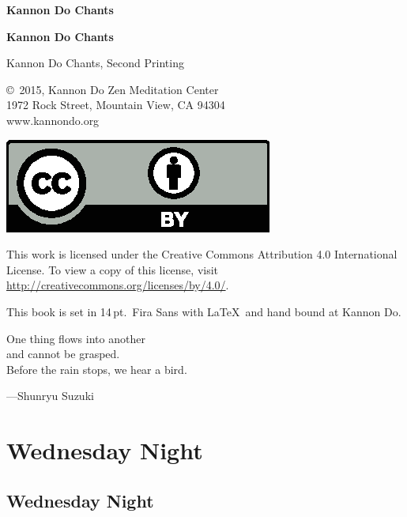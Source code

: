 \documentclass{kdo}
\begin{document}
\frontmatter
\begin{titlepage}
  \Huge\bf
Kannon Do Chants
\end{titlepage}

\cleardoublepage\thispagestyle{empty}\null\cleardoublepage\frontmatter

\begin{titlepage}
  \Huge\bf
Kannon Do Chants
\end{titlepage}

\begin{colophon}
Kannon Do Chants, Second Printing

\bigskip

\copyright\ 2015, Kannon Do Zen Meditation Center\\
1972 Rock Street, Mountain View, CA 94304\\
www.kannondo.org

\includegraphics{by}

This work is licensed under the Creative Commons Attribution 4.0 International
License. To view a copy of this license, visit\\
\url{http://creativecommons.org/licenses/by/4.0/}.

\bigskip

This book is set in 14\,pt.\ Fira Sans with \LaTeX\ and hand bound at Kannon Do.
\end{colophon}

\begin{dedication}
One thing flows into another\\
and cannot be grasped.\\
Before the rain stops, we hear a bird.

---Shunryu Suzuki
\end{dedication}

\cleardoublepage

\tableofcontents

\mainmatter
\fontsize{14pt}{16pt plus 2pt}

\part{Wednesday Night}
\chapter{Wednesday Night}
\heartOfGreatPerfectWisdomSutra
\allBuddhas
\sutraOpeningVerse
\pagebreak
\fourVows
\end{document}
